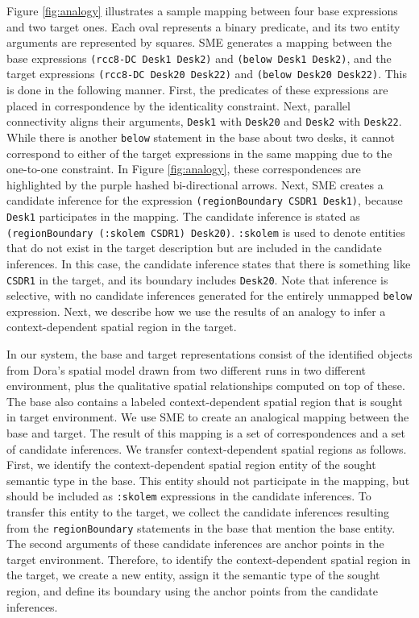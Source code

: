 \documentclass[letterpaper]{article}
\newcommand{\fw}[1]{\texttt{#1}}
\begin{document}
Figure \ref{fig:analogy} illustrates a sample mapping between four base expressions and two target ones. Each oval represents a binary predicate, and its two entity arguments are represented by squares. SME generates a mapping between the base expressions \fw{(rcc8-DC Desk1 Desk2)} and \fw{(below Desk1 Desk2)}, and the  target expressions \fw{(rcc8-DC Desk20 Desk22)} and \fw{(below Desk20 Desk22)}. This is done in the following manner. First, the predicates of these expressions are placed in correspondence by the identicality constraint. Next, parallel connectivity aligns their arguments, \fw{Desk1} with \fw{Desk20} and \fw{Desk2} with \fw{Desk22}. While there is another \fw{below} statement in the base about two desks, it cannot correspond to either of the target expressions in the same mapping due to the one-to-one constraint. In Figure \ref{fig:analogy}, these correspondences are highlighted by the purple hashed bi-directional arrows. Next, SME creates a candidate inference for the expression \fw{(regionBoundary CSDR1 Desk1)}, because \fw{Desk1} participates in the mapping. The candidate inference is stated as \fw{(regionBoundary (:skolem CSDR1) Desk20)}. \fw{:skolem} is used to denote entities that do not exist in the target description but are included in the candidate inferences. In this case, the candidate inference states that there is something like \fw{CSDR1} in the target, and its boundary includes \fw{Desk20}. Note that inference is selective, with no candidate inferences generated for the entirely unmapped \fw{below} expression. Next, we describe how we use the results of an analogy to infer a context-dependent spatial region in the target.
 

In our system, the base and target representations consist of the identified objects from Dora's spatial model drawn from two different runs in two different environment, plus the qualitative spatial relationships computed on top of these. The base also contains a labeled context-dependent spatial region that is sought in target environment. We use SME to create an analogical mapping between the base and target. The result of this mapping is a set of correspondences and a set of candidate inferences. We transfer context-dependent spatial regions as follows. First, we identify the context-dependent spatial region entity of the sought semantic type in the base. This entity should not participate in the mapping, but should be included as \fw{:skolem} expressions in the candidate inferences. To transfer this entity to the target, we collect the candidate inferences resulting from the \fw{regionBoundary} statements in the base that mention the base entity. The second arguments of these candidate inferences are anchor points in the target environment. Therefore, to identify the context-dependent spatial region in the target, we create a new entity, assign it the semantic type of the sought region, and define its boundary using the anchor points from the candidate inferences.
\end{document}

